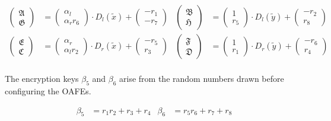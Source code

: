 \begin{align*}
\begin{pmatrix}\mathfrak{A}\\\mathfrak{G}\end{pmatrix} & =
\begin{pmatrix}\alpha_l\\\alpha_r r_6\end{pmatrix} \cdot D_l(\widetilde{x}) +
\begin{pmatrix}-r_1\\-r_7\end{pmatrix} &
\begin{pmatrix}\mathfrak{B}\\\mathfrak{H}\end{pmatrix} & =
\begin{pmatrix}1\\r_5\end{pmatrix} \cdot D_l(\widetilde{y}) +
\begin{pmatrix}-r_2\\r_8\end{pmatrix}\\
\begin{pmatrix}\mathfrak{E}\\\mathfrak{C}\end{pmatrix} & =
\begin{pmatrix}\alpha_r\\\alpha_l r_2\end{pmatrix} \cdot D_r(\widetilde{x}) +
\begin{pmatrix}-r_5\\r_3\end{pmatrix} &
\begin{pmatrix}\mathfrak{F}\\\mathfrak{D}\end{pmatrix} & =
\begin{pmatrix}1\\r_1\end{pmatrix} \cdot D_r(\widetilde{y}) +
\begin{pmatrix}-r_6\\r_4\end{pmatrix}\\
\end{align*}

\noindent{}The encryption keys $\beta_5$ and $\beta_6$ arise from the random
numbers drawn before configuring the OAFEs.

\begin{align*}
  \beta_5 & = r_1r_2 + r_3 + r_4 &
  \beta_6 & = r_5r_6 + r_7 + r_8 \\
\end{align*}


